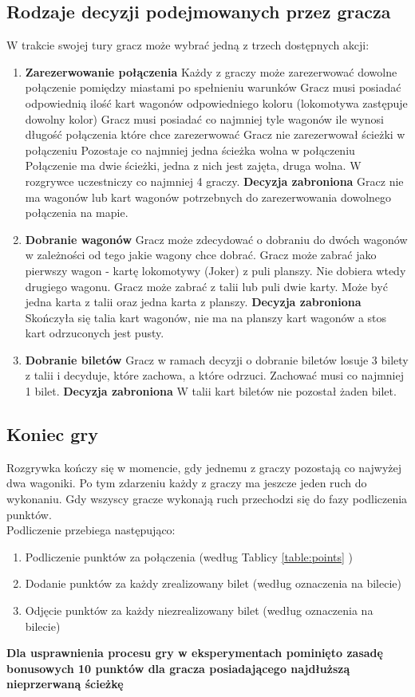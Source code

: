 \documentclass[12pt, oneside]{report}
\begin{document}
\subsection{Rodzaje decyzji podejmowanych przez gracza}
W trakcie swojej tury gracz może wybrać jedną z trzech dostępnych akcji:
\begin{enumerate}
	\item \textbf{Zarezerwowanie połączenia} 
	\subitem Każdy z graczy może zarezerwować dowolne połączenie pomiędzy miastami po spełnieniu warunków
	\subitem Gracz musi posiadać odpowiednią ilość kart wagonów odpowiedniego koloru (lokomotywa zastępuje dowolny kolor)
	\subitem Gracz musi posiadać co najmniej tyle wagonów ile wynosi długość połączenia które chce zarezerwować
	\subitem Gracz nie zarezerwował ścieżki w połączeniu
	\subitem Pozostaje co najmniej jedna ścieżka wolna w połączeniu
	\subitem Połączenie ma dwie ścieżki, jedna z nich jest zajęta, druga wolna. W rozgrywce uczestniczy co najmniej 4 graczy.
	\subitem \textbf{Decyzja zabroniona} Gracz nie ma wagonów lub kart wagonów potrzebnych do zarezerwowania dowolnego połączenia na mapie.
	\item \textbf{Dobranie wagonów}
	\subitem Gracz może zdecydować o dobraniu do dwóch wagonów w zależności od tego jakie wagony chce dobrać. 
	\subitem Gracz może zabrać jako pierwszy wagon - kartę lokomotywy (Joker) z puli planszy. Nie dobiera wtedy drugiego wagonu.
	\subitem Gracz może zabrać z talii lub puli dwie karty. Może być jedna karta z talii oraz jedna karta z planszy.
	\subitem \textbf{Decyzja zabroniona} Skończyła się talia kart wagonów, nie ma na planszy kart wagonów a stos kart odrzuconych jest pusty.
	\item \textbf{Dobranie biletów}
	\subitem Gracz w ramach decyzji o dobranie biletów losuje 3 bilety z talii i decyduje, które zachowa, a które odrzuci. Zachować musi co najmniej 1 bilet.
	\subitem \textbf{Decyzja zabroniona} W talii kart biletów nie pozostał żaden bilet.
\end{enumerate}
\subsection{Koniec gry}
Rozgrywka kończy się w momencie, gdy jednemu z graczy pozostają co najwyżej dwa wagoniki. Po tym zdarzeniu każdy z graczy ma jeszcze jeden ruch do wykonaniu. Gdy wszyscy gracze wykonają ruch przechodzi się do fazy podliczenia punktów. \\
Podliczenie przebiega następująco:
\begin{enumerate}
	\item Podliczenie punktów za połączenia (według Tablicy \ref{table:points} )
	\item Dodanie punktów za każdy zrealizowany bilet (według oznaczenia na bilecie)
	\item Odjęcie punktów za każdy niezrealizowany bilet (według oznaczenia na bilecie)
\end{enumerate}
\textbf{Dla usprawnienia procesu gry w eksperymentach pominięto zasadę bonusowych 10 punktów dla gracza posiadającego najdłuższą nieprzerwaną ścieżkę}
\end{document}
